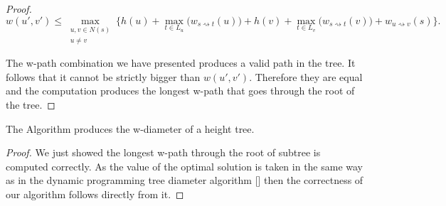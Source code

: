\begin{proof}
    $$ w(u', v') \le \max\limits_{\substack{u, v \in N(s) \\ u \ne v}}\{ h(u) + \max\limits_{t \in L_u}\Big(w_{s \rightsquigarrow t}(u)\Big) + h(v) + \max\limits_{t \in L_v}\Big(w_{s \rightsquigarrow t}(v)\Big) + w_{u \rightsquigarrow v}(s)\}. $$

    The w-path combination we have presented produces a valid path in the tree. It follows that it cannot be strictly bigger than $w(u', v')$. Therefore they are equal and the computation produces the longest w-path that goes through the root of the tree.

\end{proof}


\begin{lem} The Algorithm produces the w-diameter of a height tree. \end{lem}

\begin{proof}

    We just showed the longest w-path through the root of subtree is computed correctly. As the value of the optimal solution is taken in the same way as in the dynamic programming tree diameter algorithm [] then the correctness of our algorithm follows directly from it.

\end{proof}







